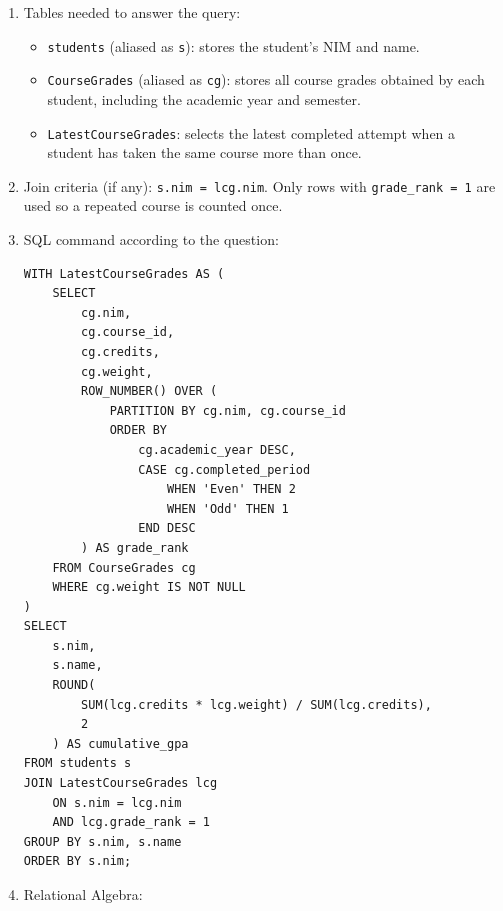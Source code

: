 \begin{enumerate}
    \itemsep0em
    \item Tables needed to answer the query:
    \begin{itemize}
        \item \texttt{students} (aliased as \texttt{s}): stores the student's NIM and name.
        \item \texttt{CourseGrades} (aliased as \texttt{cg}): stores all course grades obtained by each student, including the academic year and semester.
        \item \texttt{LatestCourseGrades}: selects the latest completed attempt when a student has taken the same course more than once.
    \end{itemize}

    \item Join criteria (if any): \texttt{s.nim = lcg.nim}. Only rows with \texttt{grade\_rank = 1} are used so a repeated course is counted once.

    \item SQL command according to the question:
    \begin{lstlisting}
WITH LatestCourseGrades AS (
    SELECT
        cg.nim,
        cg.course_id,
        cg.credits,
        cg.weight,
        ROW_NUMBER() OVER (
            PARTITION BY cg.nim, cg.course_id
            ORDER BY
                cg.academic_year DESC,
                CASE cg.completed_period
                    WHEN 'Even' THEN 2
                    WHEN 'Odd' THEN 1
                END DESC
        ) AS grade_rank
    FROM CourseGrades cg
    WHERE cg.weight IS NOT NULL
)
SELECT
    s.nim,
    s.name,
    ROUND(
        SUM(lcg.credits * lcg.weight) / SUM(lcg.credits),
        2
    ) AS cumulative_gpa
FROM students s
JOIN LatestCourseGrades lcg
    ON s.nim = lcg.nim
    AND lcg.grade_rank = 1
GROUP BY s.nim, s.name
ORDER BY s.nim;
    \end{lstlisting}

    \item Relational Algebra:


\end{enumerate}
